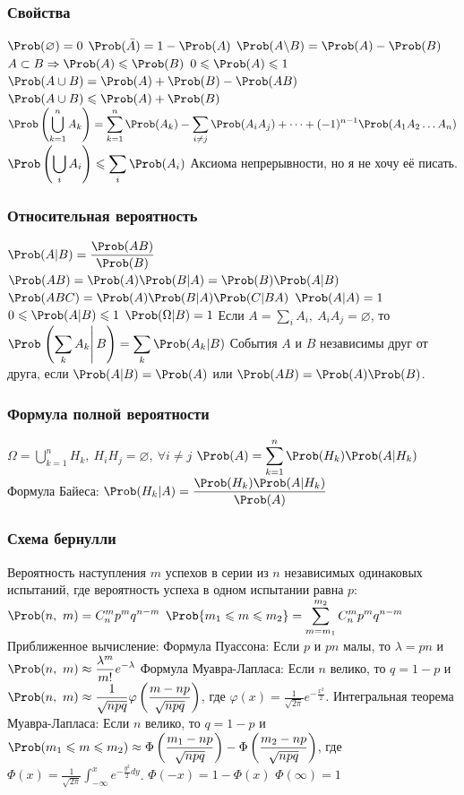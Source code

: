 \subsubsection{Свойства}
$\displaystyle \Prob(\varnothing) = 0 $
$\displaystyle \Prob(\bar{A}) = 1 - \Prob(A) $
$\displaystyle \Prob(A\backslash B) = \Prob(A) - \Prob(B) $
$\displaystyle A \subset B \Rightarrow \Prob(A) \leqslant \Prob(B) $
$\displaystyle 0 \leqslant \Prob(A) \leqslant 1 $
$\displaystyle \Prob(A\cup B) = \Prob(A) + \Prob(B) - \Prob(AB) $
$\displaystyle \Prob(A\cup B) \leqslant \Prob(A) + \Prob(B) $
$\displaystyle \Prob\left(\bigcup_{k=1}^{n} A_k\right) = \sum_{k=1}^{n}\Prob(A_k) - \sum_{i\neq j} \Prob(A_i A_j) + \dots + (-1)^{n-1} \Prob(A_1 A_2 \dots A_n) $
$\displaystyle \Prob\left(\bigcup_i A_i\right) \leqslant \sum_i \Prob(A_i) $
\*Аксиома непрерывности, но я не хочу её писать.\*
\subsubsection{Относительная вероятность}
$\displaystyle \Prob(A|B) = \frac{\Prob(AB)}{\Prob(B)} $
$\displaystyle \Prob(AB) = \Prob(A) \Prob(B|A) = \Prob(B) \Prob(A|B) $
$\displaystyle \Prob(ABC) = \Prob(A) \Prob(B|A) \Prob(C|BA) $
$\displaystyle \Prob(A|A) = 1 $
$\displaystyle 0 \leqslant \Prob(A|B) \leqslant 1 $
$\displaystyle \Prob(\Omega|B) = 1 $
Если $\displaystyle A = \sum_{i} A_i,\ A_i A_j = \varnothing $, то $\displaystyle \Prob\left.\left(\sum_k A_k\right|B\right) = \sum_k \Prob(A_k|B) $
События $A$ и $B$ независимы друг от друга, если $\Prob(A|B) = \Prob(A)$ или $\Prob(AB) = \Prob(A)\Prob(B)$.
\subsubsection{Формула полной вероятности}
$\displaystyle \Omega = \bigcup_{k=1}^n H_k,\ H_i H_j = \varnothing,\ \forall i \neq j $
$\displaystyle \Prob(A) = \sum_{k=1}^{n} \Prob(H_k) \Prob(A|H_k) $
Формула Байеса:
$\displaystyle \Prob(H_k|A) = \frac{\Prob(H_k)\Prob(A|H_k)}{\Prob(A)} $
\subsubsection{Схема бернулли}
Вероятность наступления $m$ успехов в серии из $n$ независимых одинаковых испытаний, где вероятность успеха в одном испытании равна $p$:
$\displaystyle \Prob(n,\ m) = C_n^m p^m q^{n-m} $
$\displaystyle \Prob\{m_1 \leqslant m \leqslant m_2\} = \sum_{m=m_1}^{m_2} C_n^m p^m q^{n-m} $
Приближенное вычисление:
Формула Пуассона:
Если $p$ и $pn$ малы, то $\lambda = pn$ и
$\displaystyle \Prob(n,\ m) \approx \frac{\lambda^m}{m!}e^{-\lambda} $
Формула Муавра-Лапласа:
Если $n$ велико, то $q = 1 - p$ и
$\displaystyle \Prob(n,\ m) \approx \frac{1}{\sqrt{npq}}\varphi\left(\frac{m-np}{\sqrt{npq}}\right) $, где $\varphi(x) = \frac{1}{\sqrt{2\pi}} e^{-\frac{x^2}{2}}$.
Интегральная теорема Муавра-Лапласа:
Если $n$ велико, то $q = 1 - p$ и
$\displaystyle \Prob(m_1 \leqslant m \leqslant m_2) \approx \Phi\left(\frac{m_1 - np}{\sqrt{npq}}\right) - \Phi\left(\frac{m_2 - np}{\sqrt{npq}}\right) $, где $\Phi(x) = \frac{1}{\sqrt{2\pi}} \int_{-\infty}^{x} e^{-\frac{y^2}{2} dy} $.
$\Phi(-x) = 1 - \Phi(x)$
$\Phi(\infty) = 1$
